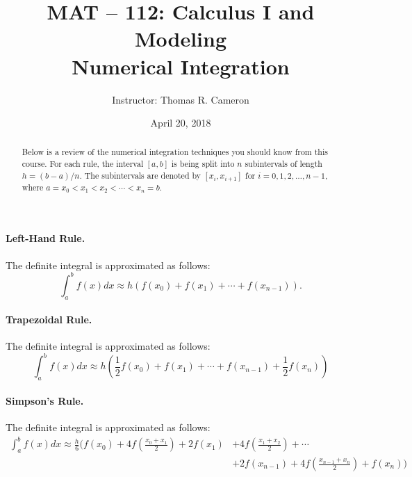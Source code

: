 \documentclass{article}
\title{MAT -- 112: Calculus I and Modeling\\
\large{Numerical Integration}}
\author{Instructor: Thomas R. Cameron}
\date{April 20, 2018}
\begin{document}
\maketitle

\begin{abstract}
Below is a review of the numerical integration techniques you should know from this course. For each rule, the interval $[a,b]$ is being split into $n$ subintervals of length $h=(b-a)/n$. The subintervals are denoted by $[x_{i},x_{i+1}]$ for $i=0,1,2,\ldots,n-1$, where $a=x_{0}<x_{1}<x_{2}<\cdots<x_{n}=b$. 
\end{abstract}

\paragraph*{Left-Hand Rule.} The definite integral is approximated as follows:
\[
\int_{a}^{b}f(x)dx\approx h\left(f(x_{0})+f(x_{1})+\cdots+f(x_{n-1})\right).
\]

\paragraph*{Trapezoidal Rule.} The definite integral is approximated as follows:
\[
\int_{a}^{b}f(x)dx\approx h\left(\frac{1}{2}f(x_{0})+f(x_{1})+\cdots+f(x_{n-1})+\frac{1}{2}f(x_{n})\right)
\]

\paragraph*{Simpson's Rule.} The definite integral is approximated as follows:
\begin{align*}
\int_{a}^{b}f(x)dx\approx \frac{h}{6}\biggl(f(x_{0})+4f\left(\frac{x_{0}+x_{1}}{2}\right)+2f(x_{1})&+4f\left(\frac{x_{1}+x_{2}}{2}\right)+\cdots \\
&+2f(x_{n-1})+4f\left(\frac{x_{n-1}+x_{n}}{2}\right)+f(x_{n})\biggr)
\end{align*}
\end{document}
